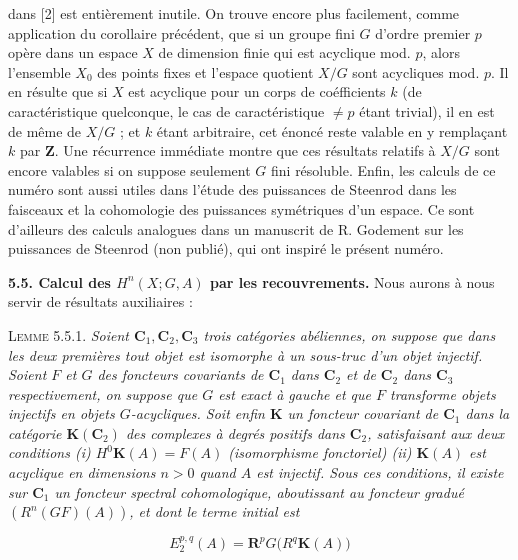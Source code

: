 \clearpage
{}

\noindent dans [2] est entièrement inutile. On trouve encore plus facilement,
comme application du corollaire précédent, que si un groupe fini $G$ d'ordre
premier $p$ opère dans un espace $X$ de dimension finie qui est acyclique mod.
$p$, alors l'ensemble $X_0$ des points fixes et l'espace quotient $X/G$ sont
acycliques mod. $p$. Il en résulte que si $X$ est acyclique pour un corps de
coéfficients $k$ (de caractéristique quelconque, le cas de caractéristique
$\ne p$ étant trivial), il en est de même de $X/G$ ; et $k$ étant arbitraire,
cet énoncé reste valable en y remplaçant $k$ par $\mathbf Z$. Une récurrence
immédiate montre que ces résultats relatifs à $X/G$ sont encore valables si on
suppose seulement $G$ fini résoluble. Enfin, les calculs de ce numéro sont
aussi utiles dans l'étude des puissances de Steenrod dans les faisceaux et la
cohomologie des puissances symétriques d'un espace. Ce sont d'ailleurs des
calculs analogues dans un manuscrit de R. Godement sur les puissances de
Steenrod (non publié), qui ont inspiré le présent numéro.

\bigskip
\textbf{5.5. Calcul des $H^n(X;G,A)$ par les recouvrements.} Nous
aurons à nous servir de résultats auxiliaires :

\textsc{Lemme 5.5.1.} \textit{Soient ${\mathbf C}_1,{\mathbf C}_2,{\mathbf C}_3$ trois catégories
abéliennes, on suppose que dans les deux premières tout objet est isomorphe à
un sous-truc d'un objet injectif. Soient $F$ et $G$ des foncteurs covariants de ${\mathbf C}_1$ dans ${\mathbf C}_2$ et de ${\mathbf C}_2$ dans ${\mathbf C}_3$ respectivement, on suppose que $G$ est exact à gauche et que $F$
transforme objets injectifs en objets $G$-acycliques. Soit enfin $\mathbf K$ un
foncteur covariant de ${\mathbf C}_1$ dans la catégorie $\mathbf K({\mathbf C}_2)$ des complexes à
degrés positifs dans ${\mathbf C}_2$, satisfaisant aux deux conditions \textup{(i)}
$H^0\mathbf K(A)=F(A)$ (isomorphisme fonctoriel) \textup{(ii)} $\mathbf K(A)$ est
acyclique en dimensions $n>0$ quand $A$ est injectif. Sous ces conditions, il
existe sur ${\mathbf C}_1$ un foncteur spectral cohomologique, aboutissant au foncteur
gradué $(R^n(GF)(A))$, et dont le terme initial est}

\[
\tag{5.5.1}
E_2^{p,q}(A)={\mathbf R}^pG\bigl(R^q\mathbf K(A)\bigr)
\]

